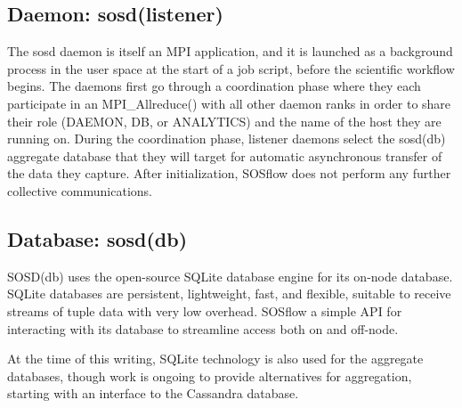 \subsection{Daemon: sosd(listener)} %
The sosd daemon is itself an MPI application, and it is launched as a
background process in the user space at the start of a job script, before
the scientific workflow begins.
%
The daemons first go through a coordination phase where they each
participate in an MPI\_Allreduce() with all other daemon ranks in
order to share their role (DAEMON, DB, or ANALYTICS) and the name of
the host they are running on.
%
During the coordination phase, listener daemons select the sosd(db)
aggregate database that they will target for automatic asynchronous
transfer of the data they capture.
%
After initialization, SOSflow does not perform any further collective
communications.
%
%

\subsection{Database: sosd(db)} %
%
SOSD(db) uses the open-source SQLite database engine for its on-node
database.
%
SQLite databases are persistent, lightweight, fast, and flexible, suitable to receive
streams of tuple data with very low overhead.
%
SOSflow a simple API for interacting with its database to streamline
access both on and off-node.
%
\par
%
At the time of this writing, SQLite technology is also used for the
aggregate databases, though work is ongoing to provide alternatives
for aggregation, starting with an interface to the Cassandra database.
%
%

